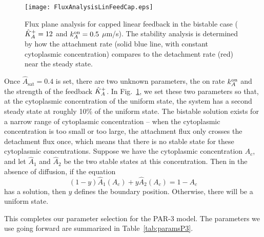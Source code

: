 \documentclass[11pt]{article}
\newcommand{\6}[1]{#1_{\text{6}}}
\newcommand{\3}[1]{#1_{\text{3}}}
\begin{document}
\begin{figure}
\centering
\texttt{[image: FluxAnalysisLinFeedCap.eps]}
\caption{\label{fig:P3Cap}Flux plane analysis for capped linear feedback in the bistable case ($\hat{K}^\text{+}_A=12$ and $k^\text{on}_A=0.5$ $\mu$m/s). The stability analysis is determined by how the attachment rate (solid blue line, with constant cytoplasmic concentration) compares to the detachment rate (red) near the steady state. }
\end{figure}

Once $\hat A_\text{sat}=0.4$ is set, there are two unknown parameters, the on rate $k^\text{on}_A$ and the strength of the feedback $\hat{K}^\text{+}_A$. In Fig.\ \ref{fig:P3Cap}, we set these two parameters so that, at the cytoplasmic concentration of the uniform state, the system has a second steady state at roughly 10\% of the uniform state. The bistable solution exists for a narrow range of cytoplasmic concentration -- when the cytoplasmic concentration is too small or too large, the attachment flux only crosses the detachment flux once, which means that there is no stable state for these cytoplasmic concentrations. Suppose we have the cytoplasmic concentration $A_c$, and let $\hat A_1$ and $\hat A_2$ be the two stable states at this concentration. Then in the absence of diffusion, if the equation 
\begin{equation}
\label{eq:NoDiffEqn}
(1-y)\hat{A}_1\left(A_c\right)+y \hat{A}_2\left(A_c\right)=1-A_c
\end{equation}
has a solution, then $y$ defines the boundary position. Otherwise, there will be a uniform state.

This completes our parameter selection for the PAR-3 model. The parameters we use going forward are summarized in Table\ \ref{tab:paramsP3}.
\end{document}
